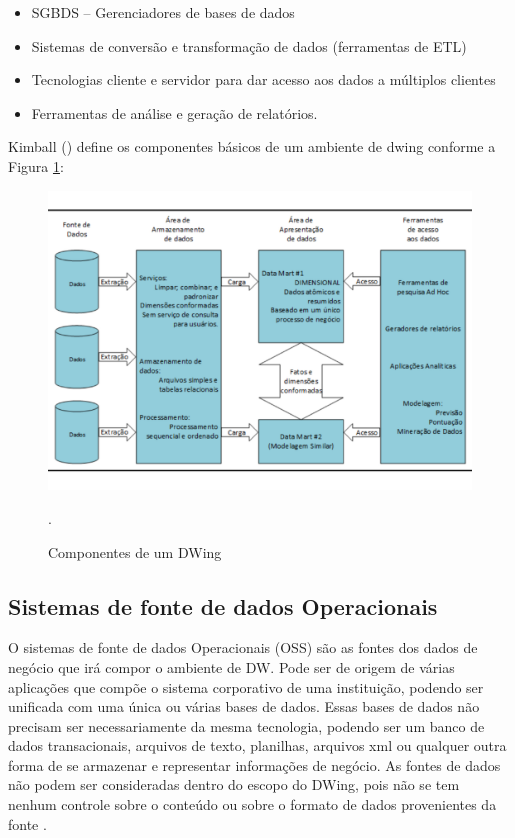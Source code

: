%

\begin{itemize}
\item SGBDS – Gerenciadores de bases de dados
\item Sistemas de conversão e transformação de dados (ferramentas de ETL)
\item Tecnologias cliente e servidor para dar acesso aos dados a múltiplos clientes
\item Ferramentas de análise e geração de relatórios.
\end{itemize}

%

Kimball (\citeyear{kimball2002}) define os componentes básicos de um ambiente de dwing conforme a Figura \ref{componentesdw}:

%

 \begin{figure}[!htb]
 	\centering
 		\includegraphics[scale=0.5]{figuras/DWcomponentes.pdf}
 		\caption{Componentes de um DWing \cite{kimball2002}}.
 		\label{componentesdw}
 \end{figure}

%

\subsection{Sistemas de fonte de dados Operacionais}

O sistemas de fonte de dados Operacionais (OSS) são as fontes dos dados de negócio que irá compor o ambiente de DW. Pode ser de origem de várias aplicações que compõe o sistema corporativo de uma instituição, podendo ser unificada com uma única ou várias bases de dados.  Essas bases de dados não precisam ser necessariamente da mesma tecnologia, podendo ser um banco de dados transacionais, arquivos de texto, planilhas, arquivos xml ou qualquer outra forma de se armazenar e representar informações de negócio. As fontes de dados não podem ser consideradas dentro do escopo do DWing, pois  não se tem nenhum controle sobre o conteúdo ou sobre o formato de dados provenientes da fonte \cite{kimball2002}.

